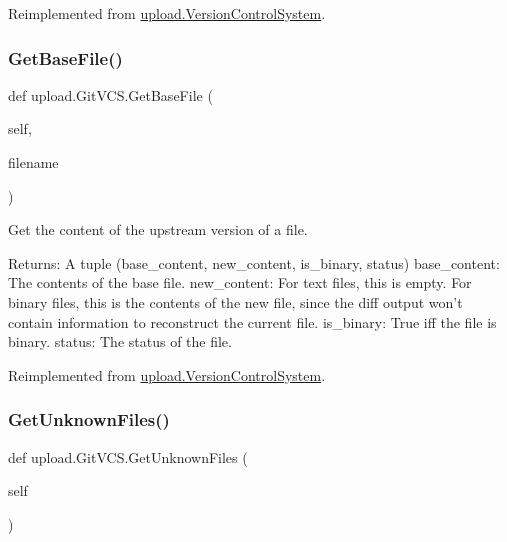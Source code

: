 Reimplemented from \mbox{\hyperlink{classupload_1_1_version_control_system_adfd9d4ecba422102233a2ba13e5bfaf5}{upload.\+Version\+Control\+System}}.

\mbox{\label{classupload_1_1_git_v_c_s_a70ddb65a6b512b8cb8cc4affa37ff9b4}} 
\subsubsection{\texorpdfstring{GetBaseFile()}{GetBaseFile()}\hspace{0.1cm}{\footnotesize\ttfamily [2/2]}}
{\footnotesize\ttfamily def upload.\+Git\+V\+C\+S.\+Get\+Base\+File (\begin{DoxyParamCaption}\item[{}]{self,  }\item[{}]{filename }\end{DoxyParamCaption})}

\begin{DoxyVerb}Get the content of the upstream version of a file.

Returns:
  A tuple (base_content, new_content, is_binary, status)
base_content: The contents of the base file.
new_content: For text files, this is empty.  For binary files, this is
  the contents of the new file, since the diff output won't contain
  information to reconstruct the current file.
is_binary: True iff the file is binary.
status: The status of the file.
\end{DoxyVerb}
 

Reimplemented from \mbox{\hyperlink{classupload_1_1_version_control_system_adfd9d4ecba422102233a2ba13e5bfaf5}{upload.\+Version\+Control\+System}}.

\mbox{\label{classupload_1_1_git_v_c_s_ae4e8c0e9fa01619c6a5c76d1ab84b995}} 
\subsubsection{\texorpdfstring{GetUnknownFiles()}{GetUnknownFiles()}\hspace{0.1cm}{\footnotesize\ttfamily [1/2]}}
{\footnotesize\ttfamily def upload.\+Git\+V\+C\+S.\+Get\+Unknown\+Files (\begin{DoxyParamCaption}\item[{}]{self }\end{DoxyParamCaption})}

